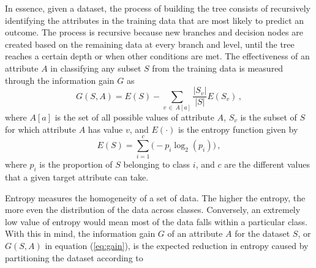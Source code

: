 In essence, given a dataset, the process of building the tree consists of recursively identifying the attributes in the training data that are most likely to predict an outcome. The process is recursive because new branches and decision nodes are created based on the remaining data at every branch and level, until the tree reaches a certain depth or when other conditions are met. The effectiveness of an attribute $A$ in classifying any subset $S$ from the training data is measured through the information gain $G$ as
% 
\begin{equation}
	\label{eq:gain}
	G(S,A) = E(S) - \sum_{v \, \in \, A[a]} \frac{ \left| S_v \right| }{ \left| S \right| } E \left( S_v \right)
	\, ,
\end{equation} 
% 
where $A[a]$ is the set of all possible values of attribute $A$, $S_v$ is the subset of $S$ for which attribute $A$ has value $v$, and $E(\cdot)$ is the entropy function given by
% 
\begin{equation}
	E(S) = \sum_{i=1}^{c} \Big( -p_i \log_2 \left(p_i\right) \Big)
	\, ,
\end{equation}
% 
where $p_i$ is the proportion of $S$ belonging to class $i$, and $c$ are the different values that a given target attribute can take.

Entropy measures the homogeneity of a set of data. The higher the entropy, the more even the distribution of the data across classes. Conversely, an extremely low value of entropy would mean most of the data falls within a particular class. With this in mind, the information gain $G$ of an attribute $A$ for the dataset $S$, or $G(S,A)$ in equation (\ref{eq:gain}), is the expected reduction in entropy caused by partitioning the dataset according to 


